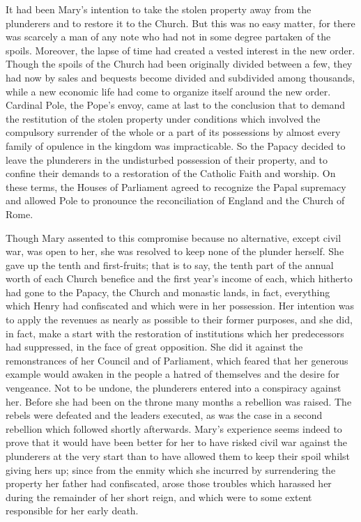 \documentclass{book}
\begin{document}
It had been Mary’s intention to take the stolen property away from the plunderers and to restore it to the Church. But this was no easy matter, for there was scarcely a man of any note who had not in some degree partaken of the spoils. Moreover, the lapse of time had created a vested interest in the new order. Though the spoils of the Church had been originally divided between a few, they had now by sales and bequests become divided and subdivided among thousands, while a new economic life had come to organize itself around the new order. Cardinal Pole, the Pope’s envoy, came at last to the conclusion that to demand the restitution of the stolen property under conditions which involved the compulsory surrender of the whole or a part of its possessions by almost every family of opulence in the kingdom was impracticable. So the Papacy decided to leave the plunderers in the undisturbed possession of their property, and to confine their demands to a restoration of the Catholic Faith and worship. On these terms, the Houses of Parliament agreed to recognize the Papal supremacy and allowed Pole to pronounce the reconciliation of England and the Church of Rome.

Though Mary assented to this compromise because no alternative, except civil war, was open to her, she was resolved to keep none of the plunder herself. She gave up the tenth and first-fruits; that is to say, the tenth part of the annual worth of each Church benefice and the first year’s income of each, which hitherto had gone to the Papacy, the Church and monastic lands, in fact, everything which Henry had confiscated and which were in her possession. Her intention was to apply the revenues as nearly as possible to their former purposes, and she did, in fact, make a start with the restoration of institutions which her predecessors had suppressed, in the face of great opposition. She did it against the remonstrances of her Council and of Parliament, which feared that her generous example would awaken in the people a hatred of themselves and the desire for vengeance. Not to be undone, the plunderers entered into a conspiracy against her. Before she had been on the throne many months a rebellion was raised. The rebels were defeated and the leaders executed, as was the case in a second rebellion which followed shortly afterwards. Mary’s experience seems indeed to prove that it would have been better for her to have risked civil war against the plunderers at the very start than to have allowed them to keep their spoil whilst giving hers up; since from the enmity which she incurred by surrendering the property her father had confiscated, arose those troubles which harassed her during the remainder of her short reign, and which were to some extent responsible for her early death.
\end{document}
